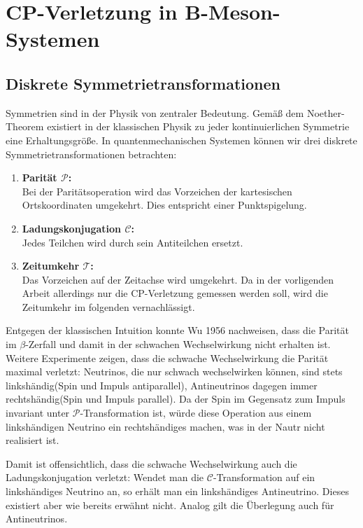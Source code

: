 \chapter{CP-Verletzung in B-Meson-Systemen}
\section{Diskrete Symmetrietransformationen}
Symmetrien sind in der Physik von zentraler Bedeutung. Gemäß dem Noether-Theorem existiert in der klassischen Physik zu jeder kontinuierlichen Symmetrie eine Erhaltungsgröße. In quantenmechanischen Systemen können wir drei diskrete Symmetrietransformationen betrachten:
\begin{enumerate}
\item \textbf{Parität $\mathcal{P}$:} \\
      Bei der Paritätsoperation wird das Vorzeichen der kartesischen Ortskoordinaten umgekehrt. Dies entspricht einer Punktspigelung.
\item \textbf{Ladungskonjugation $\mathcal{C}$:} \\
      Jedes Teilchen wird durch sein Antiteilchen ersetzt.
\item \textbf{Zeitumkehr $\mathcal{T}$:} \\
      Das Vorzeichen auf der Zeitachse wird umgekehrt. Da in der vorligenden Arbeit allerdings nur die CP-Verletzung gemessen werden soll, wird die Zeitumkehr im folgenden vernachlässigt.
\end{enumerate}
Entgegen der klassischen Intuition konnte Wu 1956 nachweisen, dass die Parität im $\beta$-Zerfall und damit in der schwachen Wechselwirkung nicht erhalten ist. Weitere Experimente zeigen, dass die schwache Wechselwirkung die Parität maximal verletzt: Neutrinos, die nur schwach wechselwirken können, sind stets \glqq linkshändig\grqq (Spin und Impuls antiparallel), Antineutrinos dagegen immer \glqq rechtshändig\grqq (Spin und Impuls parallel). Da der Spin im Gegensatz zum Impuls invariant unter $\mathcal{P}$-Transformation ist, würde diese Operation aus einem linkshändigen Neutrino ein rechtshändiges machen, was in der Nautr nicht realisiert ist.

Damit ist offensichtlich, dass die schwache Wechselwirkung auch die Ladungskonjugation verletzt: Wendet man die $\mathcal{C}$-Transformation auf ein linkshändiges Neutrino an, so erhält man ein linkshändiges Antineutrino. Dieses existiert aber wie bereits erwähnt nicht. Analog gilt die Überlegung auch für Antineutrinos.

